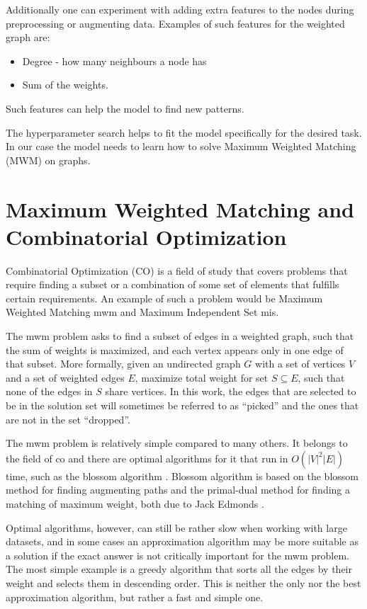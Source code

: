 Additionally one can experiment with adding extra features to the nodes during preprocessing or augmenting data. Examples of such features for the weighted graph are: 
\begin{itemize}
\item Degree - how many neighbours a node has
\item Sum of the weights. 
\end{itemize}
Such features can help the model to find new patterns.

The hyperparameter search helps to fit the model specifically for the desired task. In our case the model needs to learn how to solve Maximum Weighted Matching (MWM) on graphs.

\section{Maximum Weighted Matching and Combinatorial Optimization}

Combinatorial Optimization (CO) is a field of study that covers problems that require finding a subset or a combination of some set of elements that fulfills certain requirements. An example of such a problem would be Maximum Weighted Matching \gls{mwm} and Maximum Independent Set \gls{mis}. 

The \gls{mwm} problem asks to find a subset of edges in a weighted graph, such that the sum of weights is maximized, and each vertex appears only in one edge of that subset. More formally, given an undirected graph $G$ with a set of vertices $V$ and a set of weighted edges $E$, maximize total weight for set $S \subseteq E$, such that none of the edges in $S$ share vertices. In this work, the edges that are selected to be in the solution set will sometimes be referred to as “picked” and the ones that are not in the set “dropped”.

The \gls{mwm} problem is relatively simple compared to many others. It belongs to the field of \gls{co} and there are optimal algorithms for it that run in $O(|V|^{2}|E|)$ time, such as the blossom algorithm \cite{blossom}. Blossom algorithm is based on the blossom method for finding augmenting paths and the primal-dual method for finding a matching of maximum weight, both due to Jack Edmonds \cite{blossom}.

Optimal algorithms, however, can still be rather slow when working with large datasets, and in some cases an approximation algorithm may be more suitable as a solution if the exact answer is not critically important for the \gls{mwm} problem. The most simple example is a greedy algorithm that sorts all the edges by their weight and selects them in descending order. This is neither the only nor the best approximation algorithm, but rather a fast and simple one.

